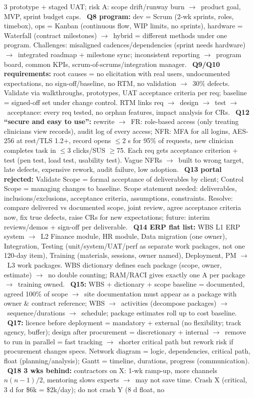\documentclass[a4paper,landscape]{article}
\newcommand{\lbl}[1]{\textbf{#1}}
\newcommand{\kh}[1]{{\setlength{\fboxsep}{0.5pt}\colorbox{keyhlcolor}{#1}}}
\newcommand{\ra}{$\rightarrow$}
\begin{document}
\begin{multicols}{3}
prototype + staged UAT; risk A: scope drift/runway burn \ra\ product goal, MVP, sprint budget caps. \textbullet\ \lbl{Q8 program:} dev = Scrum (2-wk sprints, roles, timebox), ops = Kanban (continuous flow, WIP limits, no sprints), hardware = Waterfall (contract milestones) \ra\ \kh{hybrid} = different methods under one program. Challenges: misaligned cadences/dependencies (sprint needs hardware) \ra\ integrated roadmap + milestone sync; inconsistent reporting \ra\ program board, common KPIs, scrum-of-scrums/integration manager. \textbullet\ \lbl{Q9/Q10 requirements:} root causes = no elicitation with real users, undocumented expectations, no sign-off/baseline, no RTM, no validation \ra\ 30\% defects. Validate via walkthroughs, prototypes, UAT acceptance criteria per req; baseline = signed-off set under change control. RTM links req \ra\ design \ra\ test \ra\ acceptance: every req tested, no orphan features, impact analysis for CRs. \textbullet\ \lbl{Q12 ``secure and easy to use'':} rewrite \ra\ FR: role-based access (only treating clinicians view records), audit log of every access; NFR: MFA for all logins, AES-256 at rest/TLS 1.2+, record opens $\le$2 s for 95\% of requests, new clinician completes task in $\le$3 clicks/SUS $\ge$75. Each req gets acceptance criterion + test (pen test, load test, usability test). Vague NFRs \ra\ built to wrong target, late defects, expensive rework, audit failure, low adoption. \textbullet\ \lbl{Q13 portal rejected:} \kh{Validate Scope} = formal acceptance of deliverables by client; \kh{Control Scope} = managing changes to baseline. Scope statement needed: deliverables, inclusions/exclusions, acceptance criteria, assumptions, constraints. Resolve: compare delivered vs documented scope, joint review, agree acceptance criteria now, fix true defects, raise CRs for new expectations; future: interim reviews/demos + sign-off per deliverable. \textbullet\ \lbl{Q14 ERP flat list:} WBS L1 ERP system \ra\ L2 Finance module, HR module, \kh{Data migration (one owner)}, Integration, Testing (unit/system/UAT/perf as separate work packages, not one 120-day item), Training (materials, sessions, \kh{owner named}), Deployment, PM \ra\ L3 work packages. WBS dictionary defines each package (scope, owner, estimate) \ra\ no double counting; RAM/RACI gives exactly one A per package \ra\ training owned. \textbullet\ \lbl{Q15:} WBS + dictionary + scope baseline = documented, agreed 100\% of scope \ra\ site documentation must appear as a package with owner \& contract reference; WBS \ra\ activities (decompose packages) \ra\ sequence/durations \ra\ schedule; package estimates roll up to cost baseline. \textbullet\ \lbl{Q17:} licence before deployment = \kh{mandatory + external} (no flexibility; track agency, buffer); design after procurement = \kh{discretionary + internal} \ra\ remove to run in parallel = fast tracking \ra\ shorter critical path but rework risk if procurement changes specs. Network diagram = logic, dependencies, critical path, float (planning/analysis); Gantt = timeline, durations, progress (communication). \textbullet\ \lbl{Q18 3 wks behind:} contractors on X: 1-wk ramp-up, more channels $n(n-1)/2$, mentoring slows experts \ra\ may not save time. Crash X (critical, 3 d for \$6k = \$2k/day); \kh{do not crash Y} (8 d float, no 
\end{multicols}
\end{document}
